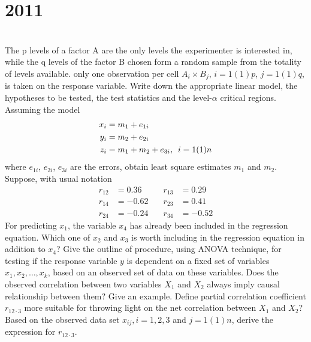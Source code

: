 \section*{2011}
\vspace{-.5cm}
\hrulefill \smallskip\\
 The p levels of a  factor A are the only levels the experimenter is interested in, while the q levels of the factor B chosen form a random sample from the totality of levels available. only one observation per cell $A_i\times B_j$, $i=1(1)p$, $j=1(1)q$, is taken on the response variable. Write down the appropriate linear model, the hypotheses to be tested, the test statistics and the level-$\alpha$ critical regions.
\myline
{} Assuming the model
\[ \begin{aligned} x_i &= m_1 + e_{1i} \\
    y_i &= m_2 + e_{2i} \\
    z_i &= m_1 + m_2 + e_{3i}, \enskip i=1(1)n
\end{aligned}\] where $e_{1i}$, $e_{2i}$, $e_{3i}$ are the errors, obtain least square estimates $m_1$ and $m_2$.
\myline
{} Suppose, with usual notation
\[ \begin{aligned} r_{12} &=0.36  &r_{13} &=0.29   \\
r_{14} &= -0.62  &r_{23} &= 0.41  \\
r_{24} &= -0.24 \quad &r_{34} &= -0.52
\end{aligned}\] For predicting $x_1$, the variable $x_4$ has already been included in the regression equation. Which one of $x_2$ and $x_3$ is worth including in the regression equation in addition to $x_4$?
\myline
{} Give the outline of procedure, using ANOVA technique, for testing if the response variable $y$ is dependent on a fixed set of variables $x_1,x_2,\dotsc,x_k$, based on an observed set of data on these variables.
\myline
{} Does the observed correlation between two variables $X_1$ and $X_2$ always imply causal relationship between them? Give an example. Define partial correlation coefficient $r_{12\cdot3}$ more suitable for throwing light on the net correlation between  $X_1$ and $X_2$? \smallskip\\
Based on the observed data set $x_{ij}, i = 1,2,3$ and $j=1(1)n$, derive the expression for $r_{12\cdot3}$.